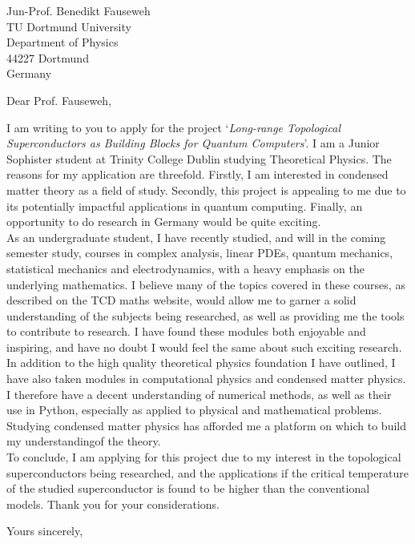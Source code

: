 \documentclass{letter}
\begin{document}
\begin{letter}{Jun-Prof. Benedikt Fauseweh\\TU Dortmund University\\
    Department of Physics\\
    44227 Dortmund\\
    Germany}

\opening{Dear Prof. Fauseweh,}
I am writing to you to apply for the project `\textit{Long-range Topological Superconductors as Building
Blocks for Quantum Computers}'. I am a Junior Sophister student at Trinity College Dublin studying Theoretical Physics. The reasons for my application are threefold. Firstly, I am interested in condensed matter theory as a field of study. Secondly, this project is appealing to me due to its potentially impactful applications in quantum computing. Finally, an opportunity to do research in Germany would be quite exciting.\\

As an undergraduate student, I have recently studied, and will in the coming semester study, courses in complex analysis, linear PDEs, quantum mechanics, statistical mechanics and electrodynamics, with a heavy emphasis on the underlying mathematics. I believe many of the topics covered in these courses, as described on the TCD maths website, would allow me to garner a solid understanding of the subjects being researched, as well as providing me the tools to contribute to research. I have found these modules both enjoyable and inspiring, and have no doubt I would feel the same about such exciting research.\\

In addition to the high quality theoretical physics foundation I have outlined, I have also taken modules in computational physics and condensed matter physics. I therefore have a decent understanding of numerical methods, as well as their use in Python, especially as applied to physical and mathematical problems. Studying condensed matter physics has afforded me a platform on which to build my understandingof the theory.\\

To conclude, I am applying for this project due to my interest in the topological superconductors being researched, and the applications if the critical temperature of the studied superconductor is found to be higher than the conventional models. Thank you for your considerations.\\

\closing{Yours sincerely,}

\end{letter}
\end{document}
